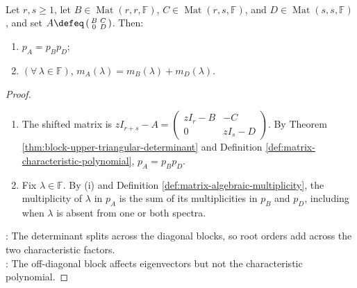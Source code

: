 \begin{proposition} \label{prop:block-upper-triangular-characteristic-polynomial} \\
Let $r,s\geq1$, let $B\in\operatorname{Mat}(r,r,\mathbb{F})$, $C\in\operatorname{Mat}(r,s,\mathbb{F})$, and $D\in\operatorname{Mat}(s,s,\mathbb{F})$, and set $A\defeq\left(\begin{smallmatrix}B&C\\0&D\end{smallmatrix}\right)$. Then:
\begin{enumerate}[label=(\roman*)]
\setlength{\itemsep}{0pt}
\item $p_A=p_Bp_D$;
\item $(\forall\,\lambda\in\mathbb{F})$, $m_A(\lambda)=m_B(\lambda)+m_D(\lambda)$.
\end{enumerate}
\begin{proof}
\begin{enumerate}[label=(\roman*)]
\setlength{\itemsep}{0pt}
\item The shifted matrix is $zI_{r+s}-A=\left(\begin{smallmatrix}zI_r-B&-C\\0&zI_s-D\end{smallmatrix}\right)$. By Theorem \ref{thm:block-upper-triangular-determinant} and Definition \ref{def:matrix-characteristic-polynomial}, $p_A=p_Bp_D$.
\item Fix $\lambda\in\mathbb{F}$. By (i) and Definition \ref{def:matrix-algebraic-multiplicity}, the multiplicity of $\lambda$ in $p_A$ is the sum of its multiplicities in $p_B$ and $p_D$, including when $\lambda$ is absent from one or both spectra.
\end{enumerate}
: The determinant splits across the diagonal blocks, so root orders add across the two characteristic factors.\\
: The off-diagonal block affects eigenvectors but not the characteristic polynomial.
\end{proof}
\end{proposition}

